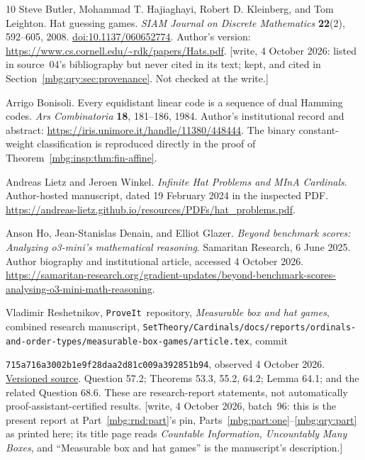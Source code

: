 \documentclass[11pt,letterpaper]{article}
\theoremstyle{definition}
\newcommand{\repo}{\texttt{ProveIt}}
\begin{document}
\begin{thebibliography}{10}
Steve Butler, Mohammad T. Hajiaghayi, Robert D. Kleinberg, and
Tom Leighton.
Hat guessing games.
\emph{SIAM Journal on Discrete Mathematics} \textbf{22}(2),
592--605, 2008.
\href{https://doi.org/10.1137/060652774}{doi:10.1137/060652774}.
Author's version:
\url{https://www.cs.cornell.edu/~rdk/papers/Hats.pdf}.
{\small[write, 4 October 2026: listed in source~04's bibliography but never cited in its text; kept, and cited in Section~\ref{mbg:qry:sec:provenance}. Not checked at the write.]}

Arrigo Bonisoli.
Every equidistant linear code is a sequence of dual Hamming codes.
\emph{Ars Combinatoria} \textbf{18}, 181--186, 1984.
Author's institutional record and abstract:
\url{https://iris.unimore.it/handle/11380/448444}.
The binary constant-weight classification is reproduced directly in
the proof of Theorem~\ref{mbg:insp:thm:fin-affine}.

Andreas Lietz and Jeroen Winkel.
\emph{Infinite Hat Problems and MInA Cardinals}.
Author-hosted manuscript, dated 19 February 2024 in the inspected PDF.
\url{https://andreas-lietz.github.io/resources/PDFs/hat_problems.pdf}.

Anson Ho, Jean-Stanislas Denain, and Elliot Glazer.
\emph{Beyond benchmark scores: Analyzing o3-mini's mathematical reasoning}.
Samaritan Research, 6 June 2025.
Author biography and institutional article, accessed 4 October 2026.
\url{https://samaritan-research.org/gradient-updates/beyond-benchmark-scores-analysing-o3-mini-math-reasoning}.

Vladimir Reshetnikov, \repo\ repository,
\emph{Measurable box and hat games}, combined research manuscript,
\nolinkurl{SetTheory/Cardinals/docs/reports/ordinals-and-order-types/measurable-box-games/article.tex},
commit\par
{\small\texttt{715a716a3002b1e9f28daa2d81c009a392851b94}},
observed 4 October 2026.
\href{https://github.com/VladimirReshetnikov/ProveIt/blob/715a716a3002b1e9f28daa2d81c009a392851b94/SetTheory/Cardinals/docs/reports/ordinals-and-order-types/measurable-box-games/article.tex}{Versioned source}.
Question 57.2; Theorems 53.3, 55.2, 64.2; Lemma 64.1;
and the related Question 68.6. These are research-report statements,
not automatically proof-assistant-certified results.
{\small[write, 4 October 2026, batch~96: this is the present report at Part~\ref{mbg:rnd:part}'s pin, Parts~\ref{mbg:part:one}--\ref{mbg:qry:part} as printed here; its title page reads \emph{Countable Information, Uncountably Many Boxes}, and ``Measurable box and hat games'' is the manuscript's description.]}


\end{thebibliography}
\end{document}
